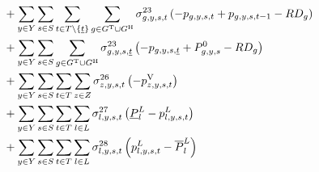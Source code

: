 \documentclass{article}
\begin{document}
\begin{align}
		& + \sum\limits_{\iYear \in \sYears}\sum\limits_{\iScenario \in \sScenarios}\sum\limits_{\iInterval \in \sIntervals \setminus \{\iIntervalStart\}} \sum\limits_{\iGenerator \in \sGeneratorsThermal \cup \sGeneratorsHydro} \dRampRateDown \left(- \vPower + \vPower[\iGenerator,\iYear,\iScenario,\iInterval-1] - \cRampRateDown\right)\\
		& + \sum\limits_{\iYear \in \sYears}\sum\limits_{\iScenario \in \sScenarios} \sum\limits_{\iGenerator \in \sGeneratorsThermal \cup \sGeneratorsHydro} \dRampRateDown[\iGenerator,\iYear,\iScenario,\iIntervalStart] \left(- \vPower[\iGenerator,\iYear,\iScenario,\iIntervalStart] + \cPowerInitial - \cRampRateDown\right)\\
		& + \sum\limits_{\iYear \in \sYears}\sum\limits_{\iScenario \in \sScenarios}\sum\limits_{\iInterval \in \sIntervals} \sum\limits_{\iZone \in \sZones} \dNonNegativeLostLoad \left(- \vLostLoadPower\right)\\
		& + \sum\limits_{\iYear \in \sYears}\sum\limits_{\iScenario \in \sScenarios}\sum\limits_{\iInterval \in \sIntervals} \sum\limits_{\iLink \in \sLinks} \dMinPowerFlow \left(\cPowerFlowMin - \vPowerFlow\right)\\
		& + \sum\limits_{\iYear \in \sYears}\sum\limits_{\iScenario \in \sScenarios}\sum\limits_{\iInterval \in \sIntervals} \sum\limits_{\iLink \in \sLinks} \dMaxPowerFlow \left(\vPowerFlow - \cPowerFlowMax\right)\\\nonumber
\end{align}
\end{document}
